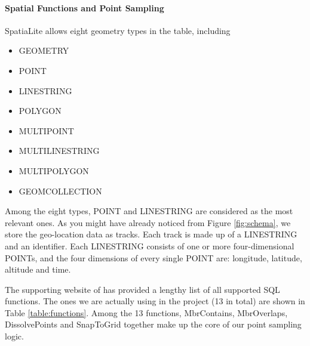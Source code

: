 \documentclass[12pt,a4paper]{article}
\renewcommand\texttt[1]{{\ttfamily\color{textttColor}#1}}
\begin{document}
            \paragraph{Spatial Functions and Point Sampling}
                
                SpatiaLite allows eight geometry types in the table, including
                \begin{multicols}{3}
                \begin{itemize}
                    \setlength\itemsep{-0.5em}
                    \item \texttt{GEOMETRY}
                    \item \texttt{POINT}
                    \item \texttt{LINESTRING}
                    \item \texttt{POLYGON}
                    \item \texttt{MULTIPOINT}
                    \item \texttt{MULTILINESTRING}
                    \item \texttt{MULTIPOLYGON}
                    \item \texttt{GEOMCOLLECTION}
                    
                \end{itemize}
                \end{multicols}
                Among the eight types, \texttt{POINT} and \texttt{LINESTRING} are considered as the most relevant ones. As you might have already noticed from Figure \ref{fig:schema}, we store the geo-location data as tracks. Each track is made up of a \texttt{LINESTRING} and an identifier. Each \texttt{LINESTRING} consists of one or more four-dimensional \texttt{POINT}s, and the four dimensions of every single \texttt{POINT} are: longitude, latitude, altitude and time.
                
                The supporting website of \citet{SpatiaLiteWebsite} has provided a lengthy list of all supported SQL functions. The ones we are actually using in the project (13 in total) are shown in Table \ref{table:functions}. Among the 13 functions, \texttt{MbrContains}, \texttt{MbrOverlaps}, \texttt{DissolvePoints} and \texttt{SnapToGrid} together make up the core of our point sampling logic.
                
\end{document}
